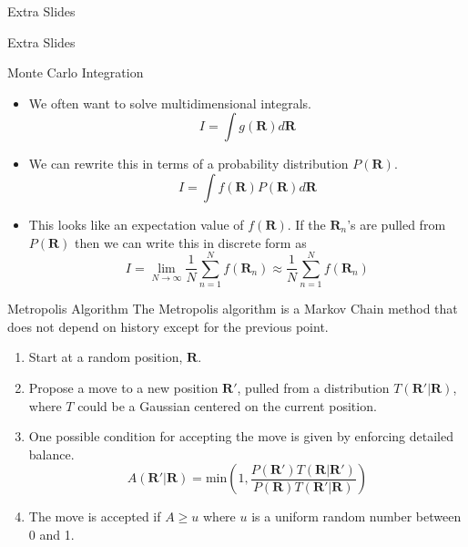 \documentclass{beamer}
\newcommand{\R}{\mathbf{R}}
\begin{document}
\appendix
\begin{frame}{Extra Slides}
\begin{centering}
   Extra Slides
\end{centering}
\end{frame}

\begin{frame}{Monte Carlo Integration}
\begin{itemize}
   \item We often want to solve multidimensional integrals.
      \begin{equation*}
         I=\int g(\R)d\R
      \end{equation*}
   \item We can rewrite this in terms of a probability distribution $P(\R)$.
      \begin{equation*}
         I=\int f(\R)P(\R)d\R
      \end{equation*}
   \item This looks like an expectation value of $f(\R)$. If the $\R_n$'s are pulled from $P(\R)$ then we can write this in discrete form as
   \begin{equation*}
      I=\lim\limits_{N\rightarrow\infty} \frac{1}{N}\sum\limits_{n=1}^N f(\R_n) \approx \frac{1}{N}\sum\limits_{n=1}^N f(\R_n)
   \end{equation*}
\end{itemize}
\end{frame}

\begin{frame}{Metropolis Algorithm}
   The Metropolis algorithm is a Markov Chain method that does not depend on history except for the previous point.
\begin{enumerate}
   \item Start at a random position, $\R$.
   \item Propose a move to a new position $\R'$, pulled from a distribution $T(\R'|\R)$, where $T$ could be a Gaussian centered on the current position. %
   \item One possible condition for accepting the move is given by enforcing detailed balance.
   \begin{equation*}
      A(\R'|\R) = \mathrm{min}\left(1,\frac{P(\R')T(\R|\R')}{P(\R)T(\R'|\R)}\right)
   \end{equation*}
   \item The move is accepted if $A\ge u$ where $u$ is a uniform random number between 0 and 1.
\end{enumerate}
\end{frame}
\end{document}
